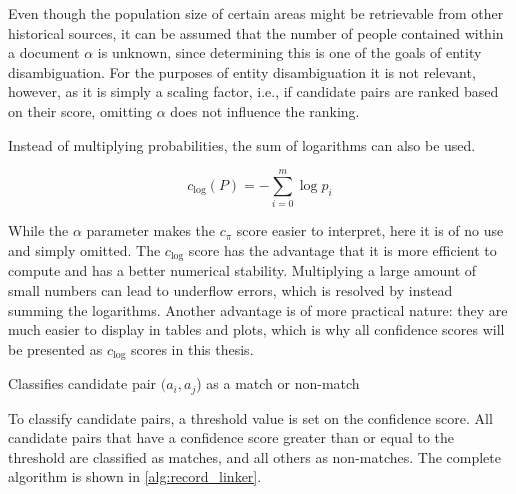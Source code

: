 Even though the population size of certain areas might be retrievable from other historical sources, it can be assumed that the number of people contained within a document $\alpha$ is unknown, since determining this is one of the goals of entity disambiguation.
For the purposes of entity disambiguation it is not relevant, however, as it is simply a scaling factor, i.e., if candidate pairs are ranked based on their score, omitting $\alpha$ does not influence the ranking.

Instead of multiplying probabilities, the sum of logarithms can also be used.

\begin{equation}
    c_{\mathrm{log}}(P) = -\sum_{i=0}^{m} \log{p_i}
    \label{eq:confidence1}
\end{equation}

\noindent While the $\alpha$ parameter makes the $c_{\pi}$ score easier to interpret, here it is of no use and simply omitted.
The $c_{\mathrm{log}}$ score has the advantage that it is more efficient to compute and has a better numerical stability.
Multiplying a large amount of small numbers can lead to underflow errors, which is resolved by instead summing the logarithms.
Another advantage is of more practical nature: they are much easier to display in tables and plots, which is why all confidence scores will be presented as $c_{\mathrm{log}}$ scores in this thesis.

\begin{algorithm}[tb]
    \caption{Classifies candidate pair $(a_i, a_j$) as a match or non-match}
    \label{alg:record_linker}
    
\end{algorithm}

To classify candidate pairs, a threshold value is set on the confidence score.
All candidate pairs that have a confidence score greater than or equal to the threshold are classified as matches, and all others as non-matches.
The complete algorithm is shown in \cref{alg:record_linker}.